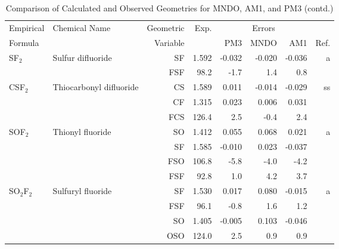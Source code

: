 \begin{table}
\caption{\label{geotabi}Comparison of Calculated and Observed Geometries for 
MNDO, AM1, and PM3 (contd.)}
\begin{center}
\compresstable
\begin{tabular}{llrrrrrr}
 Empirical  & Chemical Name &  Geometric &  Exp. & \multicolumn{3}{c}{Errors} & \\
  Formula   &               &  Variable &        & PM3  & MNDO  &  AM1 & Ref.\\
\hline
 SF$_2$         & Sulfur difluoride                  &SF            &     1.592   &    -0.032 &    -0.020 &    -0.036 &     a \\
             &                                    &FSF         &      98.2   &      -1.7 &       1.4 &       0.8   &       \\
 CSF$_2$        & Thiocarbonyl difluoride            &CS            &     1.589   &     0.011 &    -0.014 &    -0.029 &    ss \\
             &                                    &CF            &     1.315   &     0.023 &     0.006 &     0.031 &       \\
             &                                    &FCS         &     126.4   &       2.5 &      -0.4 &       2.4   &       \\
 SOF$_2$        & Thionyl fluoride                   &SO            &     1.412   &     0.055 &     0.068 &     0.021 &     a \\
             &                                    &SF            &     1.585   &    -0.010 &     0.023 &    -0.037 &       \\
             &                                    &FSO         &     106.8   &      -5.8 &      -4.0 &      -4.2   &       \\
             &                                    &FSF         &      92.8   &       1.0 &       4.2 &       3.7   &       \\
 SO$_2$F$_2$       & Sulfuryl fluoride                  &SF            &     1.530   &     0.017 &     0.080 &    -0.015 &     a \\
             &                                    &FSF         &      96.1   &      -0.8 &       1.6 &       1.2   &       \\
             &                                    &SO            &     1.405   &    -0.005 &     0.103 &    -0.046 &       \\
             &                                    &OSO         &     124.0   &       2.5 &       0.9 &       0.9   &       \\

\end{tabular}
\end{center}
\end{table}
